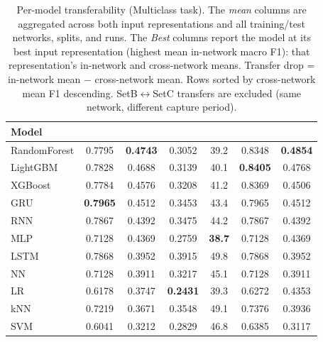 \begin{table}
    \centering
    \caption{Per-model transferability (Multiclass task). The \emph{mean} columns are aggregated across both input representations and all training/test networks, splits, and runs. The \emph{Best} columns report the model at its best input representation (highest mean in-network macro F1): that representation's in-network and cross-network means. Transfer drop = in-network mean $-$ cross-network mean. Rows sorted by cross-network mean F1 descending. SetB$\leftrightarrow$SetC transfers are excluded (same network, different capture period).}
    \label{tab:q3_per_model_multiclass}


    \begin{tabular}{
        l
        S[table-format=1.4]
        S[table-format=1.4]
        S[table-format=1.4]
        S[table-format=2.1]
        S[table-format=1.4]
        S[table-format=1.4]
    }
    \toprule
    \textbf{Model} & {} & {} & {} & {} & {} & {} \\
    \midrule
    RandomForest & 0.7795 & \textbf{0.4743} & 0.3052 & 39.2 & 0.8348 & \textbf{0.4854} \\
    LightGBM & 0.7828 & 0.4688 & 0.3139 & 40.1 & \textbf{0.8405} & 0.4768 \\
    XGBoost & 0.7784 & 0.4576 & 0.3208 & 41.2 & 0.8369 & 0.4506 \\
    GRU & \textbf{0.7965} & 0.4512 & 0.3453 & 43.4 & 0.7965 & 0.4512 \\
    RNN & 0.7867 & 0.4392 & 0.3475 & 44.2 & 0.7867 & 0.4392 \\
    MLP & 0.7128 & 0.4369 & 0.2759 & \textbf{38.7} & 0.7128 & 0.4369 \\
    LSTM & 0.7868 & 0.3952 & 0.3915 & 49.8 & 0.7868 & 0.3952 \\
    NN & 0.7128 & 0.3911 & 0.3217 & 45.1 & 0.7128 & 0.3911 \\
    LR & 0.6178 & 0.3747 & \textbf{0.2431} & 39.3 & 0.6272 & 0.4353 \\
    kNN & 0.7219 & 0.3671 & 0.3548 & 49.1 & 0.7376 & 0.3936 \\
    SVM & 0.6041 & 0.3212 & 0.2829 & 46.8 & 0.6385 & 0.3117 \\
    \bottomrule
    \end{tabular}
\end{table}
